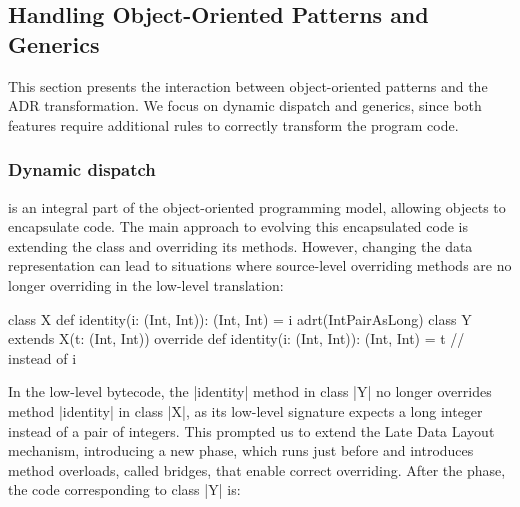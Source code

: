 

\subsection{Handling Object-Oriented Patterns and Generics}
\label{sec:ildl:generics}

This section presents the interaction between object-oriented patterns and the ADR transformation. We focus on dynamic dispatch and generics, since both features require additional rules to correctly transform the program code.

\subsubsection{Dynamic dispatch}
is an integral part of the object-oriented programming model, allowing objects to encapsulate code. The main approach to evolving this encapsulated code is extending the class and overriding its methods. However, changing the data representation can lead to situations where source-level overriding methods are no longer overriding in the low-level translation:

\begin{lstlisting-nobreak}
class X {
  def identity(i: (Int, Int)): (Int, Int) = i
}
adrt(IntPairAsLong) {
  class Y extends X(t: (Int, Int)) {
    override def identity(i: (Int, Int)): (Int, Int) = t // instead of i
  }
}
\end{lstlisting-nobreak}

In the low-level bytecode, the |identity| method in class |Y| no longer overrides method |identity| in class |X|, as its low-level signature expects a long integer instead of a pair of integers. This prompted us to extend the Late Data Layout mechanism, introducing a new \bridge{} phase, which runs just before \coerce{} and introduces method overloads, called bridges, that enable correct overriding. After the \inject{} phase, the code corresponding to class |Y| is:

